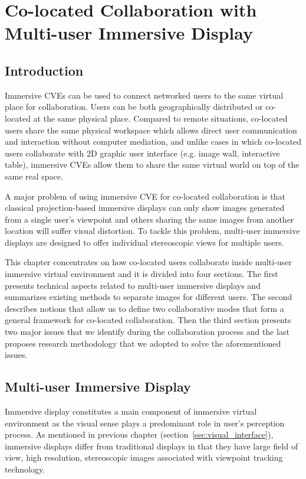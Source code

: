 \chapter{Co-located Collaboration with Multi-user Immersive Display}
\label{chapter:colocated_colab}
\minitoc

\section{Introduction}
Immersive CVEs can be used to connect networked users to the same virtual place for collaboration. Users can be both geographically distributed or co-located at the same physical place. Compared to remote situations, co-located users share the same physical workspace which allows direct user communication and interaction without computer mediation, and unlike cases in which co-located users collaborate with 2D graphic user interface (e.g. image wall, interactive table), immersive CVEs allow them to share the same virtual world on top of the same real space.

A major problem of using immersive CVE for co-located collaboration is that classical projection-based immersive displays can only show images generated from a single user's viewpoint and others sharing the same images from another location will suffer visual distortion. To tackle this problem, multi-user immersive displays are designed to offer individual stereoscopic views for multiple users.

This chapter concentrates on how co-located users collaborate inside multi-user immersive virtual environment and it is divided into four sections. The first presents technical aspects related to multi-user immersive displays and summarizes existing methods to separate images for different users. The second describes notions that allow us to define two collaborative modes that form a general framework for co-located collaboration. Then the third section presents two major issues that we identify during the collaboration process and the last proposes research methodology that we adopted to solve the aforementioned issues.  


\section{Multi-user Immersive Display}
Immersive display constitutes a main component of immersive virtual environment as the visual sense plays a predominant role in user's perception process. As mentioned in previous chapter (section~\ref{sec:visual_interface}), immersive displays differ from traditional displays in that they have large field of view, high resolution, stereoscopic images associated with viewpoint tracking technology.


